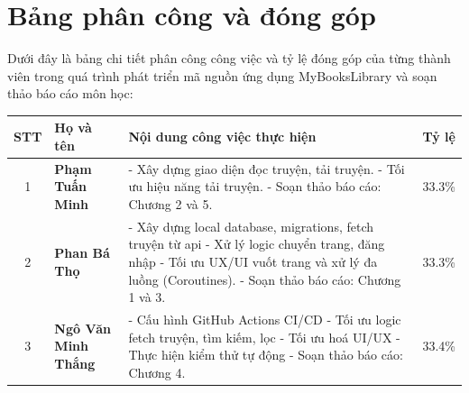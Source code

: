 \chapter*{Bảng phân công và đóng góp}

Dưới đây là bảng chi tiết phân công công việc và tỷ lệ đóng góp của từng thành viên trong quá trình phát triển mã nguồn ứng dụng MyBooksLibrary và soạn thảo báo cáo môn học:

\begin{table}[H]
    \centering
    \renewcommand{\arraystretch}{1.5}
    \begin{tabular}{|c|p{4cm}|p{8cm}|c|}
    \hline
    \textbf{STT} & \textbf{Họ và tên} & \textbf{Nội dung công việc thực hiện} & \textbf{Tỷ lệ} \\ \hline
    1 & \textbf{Phạm Tuấn Minh} & 
    - Xây dựng giao diện đọc truyện, tải truyện. \newline
    - Tối ưu hiệu năng tải truyện. \newline
    - Soạn thảo báo cáo: Chương 2 và 5.
    & 33.3\% \\ \hline
    
    2 & \textbf{Phan Bá Thọ}& 
    - Xây dựng local database, migrations, fetch truyện từ api \newline
    - Xử lý logic chuyển trang, đăng nhập \newline
    - Tối ưu UX/UI vuốt trang và xử lý đa luồng (Coroutines). \newline
    - Soạn thảo báo cáo: Chương 1 và 3.
    & 33.3\% \\ \hline
    
    3 & \textbf{Ngô Văn Minh Thắng} & 
    - Cấu hình GitHub Actions CI/CD \newline
    - Tối ưu logic fetch truyện, tìm kiếm, lọc \newline
    - Tối ưu hoá UI/UX \newline
    - Thực hiện kiểm thử tự động \newline
    - Soạn thảo báo cáo: Chương 4.
    & 33.4\% \\ \hline
    \end{tabular}
\end{table}